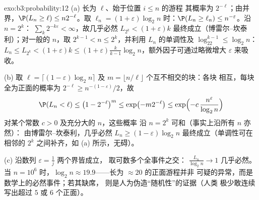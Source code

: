 \begin{solution}{exo:b3:probability:12}
(a) 长为 $\ell$、始于位置 $i \leq n$ 的游程
其概率为 $2^{-\ell}$；由并界，$\P(L_n \geq \ell)
\leq n2^{-\ell}$。取 $\ell_n = (1 +
\varepsilon)\log_2n$ 时：$\P(L_n \geq \ell_n) \leq
n^{-\varepsilon}$。沿 $n = 2^k$：
$\sum_k2^{-k\varepsilon} < \infty$，故几乎必然 $L_{2^k} <
(1+\varepsilon)k$ 最终成立（博雷尔--坎泰利）；对一般的
$n$，取 $2^{k-1} < n \leq 2^k$，并利用
$L_n$ 的单调性及 $\log_22^{k-1} \leq \log_2n$：$L_n \leq L_{2^k}
< (1 + \varepsilon)k \leq (1 + \varepsilon)\frac{k}{k-1}
\log_2n$，额外因子可通过略微增大
$\varepsilon$ 来吸收。

(b) 取 $\ell = \lceil(1 - \varepsilon)\log_2n\rceil$ 及
$m = \lfloor n/\ell\rfloor$ 个互不相交的块：各块
相互，每块全为正面的概率为 $2^{-\ell}
\geq n^{-(1-\varepsilon)}/2$，故
\[
\P(L_n < \ell) \leq \bigl(1 - 2^{-\ell}\bigr)^{m}
\leq \exp\bigl(-m2^{-\ell}\bigr)
\leq \exp\Bigl(-c\,\frac{n^{\varepsilon}}{\log_2n}\Bigr)
\]
对某个常数 $c > 0$ 及充分大的 $n$，这些概率
沿 $n = 2^k$ 可和（事实上沿所有 $n$ 亦然）：
由博雷尔--坎泰利，几乎必然 $L_n \geq (1 -
\varepsilon)\log_2n$ 最终成立（单调性可在
相邻的 $2^k$ 之间补齐，如 (a) 所示，无碍）。

(c) 沿数列 $\varepsilon = \frac1j$ 两个界皆成立，
取可数多个全事件之交：
$\frac{L_n}{\log_2n} \to 1$ 几乎必然。当 $n = 10^6$ 时，$\log_2n
\approx 19.9$——长为 $\approx 20$ 的正面游程并非
可疑的异常，而是数学上的必然事件；若其缺席，
则是人为伪造“随机性”的证据（人类
极少敢连续写出超过 $5$ 或 $6$ 个正面）。
\end{solution}

